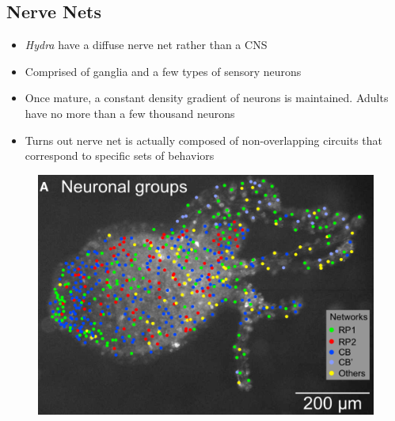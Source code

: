 \documentclass{article}
\begin{document}
\subsection{Nerve Nets}
\begin{itemize}
\item \textit{Hydra} have a diffuse nerve net rather than a CNS
\item Comprised of ganglia and a few types of sensory neurons
\item Once mature, a constant density gradient of neurons is maintained. Adults have no more than a few thousand neurons
\item Turns out nerve net is actually composed of non-overlapping circuits that correspond to specific sets of behaviors
\end{itemize}
\begin{figure}
\centering
\includegraphics[scale=0.25]{hydra_map.png}
\end{figure}
\end{document}
